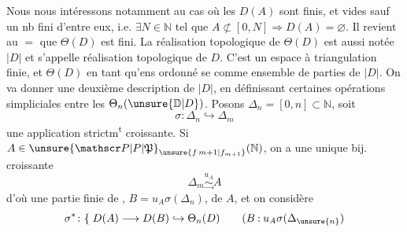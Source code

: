 Nous nous intéressons notamment au cas où les $D(A)$ sont finis, et vides sauf un nb fini d'entre eux, i.e. $\exists N\in\mathbb N$ tel que $A\not\subset[0,N]\Longrightarrow D(A)=\varnothing$. Il revient au $=$ que $\Theta(D)$ est fini.
La réalisation topologique  de $\Theta(D)$  est aussi notée $|D|$ et s'appelle réalisation topologique de $D$.
C'est un espace à triangulation finie,  et $\Theta(D)$ en tant qu'ens ordonné se  comme ensemble de parties de $|D|$.
On va donner une deuxième description de $|D|$, en définissant certaines opérations simpliciales entre les $\Theta_n(\unsure{\mathbb D|D})$.
Posons $\Delta_n=[0,n]\subset\mathbb N$, soit
\[
\sigma\colon\Delta_n\hookrightarrow\Delta_m
\]
une application strictm\textsuperscript{t} croissante. Si
$A\in\unsure{\mathscr P|P|\mathfrak P}_{\unsure{f\,m+1|f_{m+1}}}(\mathbb N)$, on a une unique bij. croissante
\[
\Delta_m\overset{u_A}{\underset{\longrightarrow}{\sim}} A
\]
d'où une partie finie de  , $B=u_A\sigma(\Delta_n)$, de $A$, et on considère
\[
\sigma^*\colon\{\;D(A)\longrightarrow D(B)\hookrightarrow\Theta_n(D)
\qquad (B\mathbin{:}u_A\sigma(\Delta_{\unsure{n}})
\]
